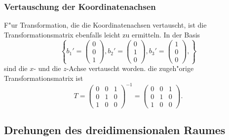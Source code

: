 \subsubsection{Vertauschung der Koordinatenachsen}
F"ur Transformation, die die Koordinatenachsen vertauscht, ist
die Transformationsmatrix ebenfalls leicht zu ermitteln. 
In der Basis
\[
\left\{
b_1'=\begin{pmatrix}0\\0\\1\end{pmatrix},
b_2'=\begin{pmatrix}0\\1\\0\end{pmatrix},
b_3'=\begin{pmatrix}1\\0\\0\end{pmatrix},
\right\}
\]
sind die $x$- und die $z$-Achse vertauscht worden. 
die zugeh"orige Transformationsmatrix ist
\begin{equation}
T=\begin{pmatrix}
0&0&1\\
0&1&0\\
1&0&0
\end{pmatrix}^{-1}
=
\begin{pmatrix}
0&0&1\\
0&1&0\\
1&0&0
\end{pmatrix}.
\label{transformation-vertauschung}
\end{equation}

\subsection{Drehungen des dreidimensionalen Raumes}
